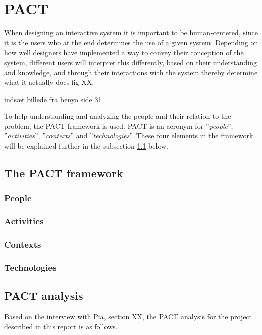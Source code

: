 \section{PACT}\label{sec:PACT}
When designing an interactive system it is important to be human-centered, since it is the users who at the end determines the use of a given system.
Depending on how well designers have implemented a way to convey their conception of the system, different users will interpret this differently, based on their understanding and knowledge, and through their interactions with the system thereby determine what it actually does {\color{red}fig XX}.

{\color{red}indsæt billede fra benyo side 31}

To help understanding and analyzing the people and their relation to the problem, the PACT framework is used.
PACT is an acronym for ''{\itshape{people}}'', ''{\itshape{activities}}'', ''{\itshape{contexts}}'' and ''{\itshape{technologies}}''.
These four elements in the framework will be explained further in the subsection \ref{sec:PACT-framework} below.

\subsection{The PACT framework}\label{sec:PACT-framework}
\subsubsection*{People}

\subsubsection*{Activities}

\subsubsection*{Contexts}

\subsubsection*{Technologies}


\subsection{PACT analysis}\label{sec:PACT-analysis}
Based on the interview
with Pia,
{\color{red} section XX}, the PACT analysis for the project described in this report is as follows.

